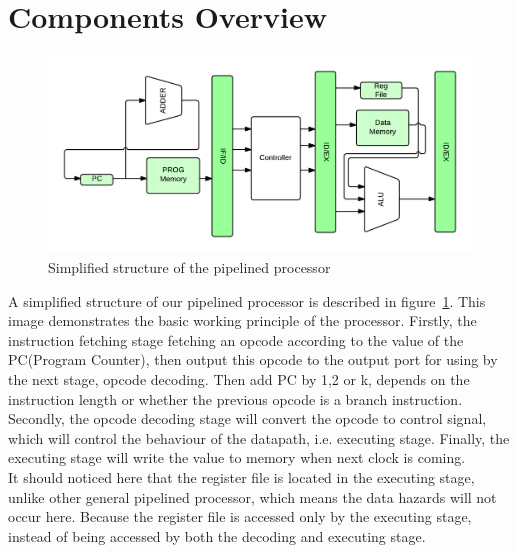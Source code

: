 \documentclass[12pt,a4paper]{report}
\begin{document}
\section{Components Overview}
\begin{figure}[h]
  \centering
  \includegraphics[width=\textwidth]{CPUOverview}
  \caption{Simplified structure of the pipelined processor}
  \label{fig:CPUOverview}
\end{figure}
A simplified structure of our pipelined processor is described in figure~\ref{fig:CPUOverview}. This image demonstrates the basic working principle of the processor. Firstly, the instruction fetching stage fetching an opcode according to the value of the PC(Program Counter), then output this opcode to the output port for using by the next stage, opcode decoding. Then add PC by 1,2 or k, depends on the instruction length or whether the previous opcode is a branch instruction. Secondly, the opcode decoding stage will convert the opcode to control signal, which will control the behaviour of the datapath, i.e. executing stage. Finally, the executing stage will write the value to memory when next clock is coming.  \\
It should noticed here that the register file is located in the executing stage, unlike other general pipelined processor, which means the data hazards will not occur here. Because the register file is accessed only by the executing stage, instead of being accessed by both the decoding and executing stage.\\
\end{document}
